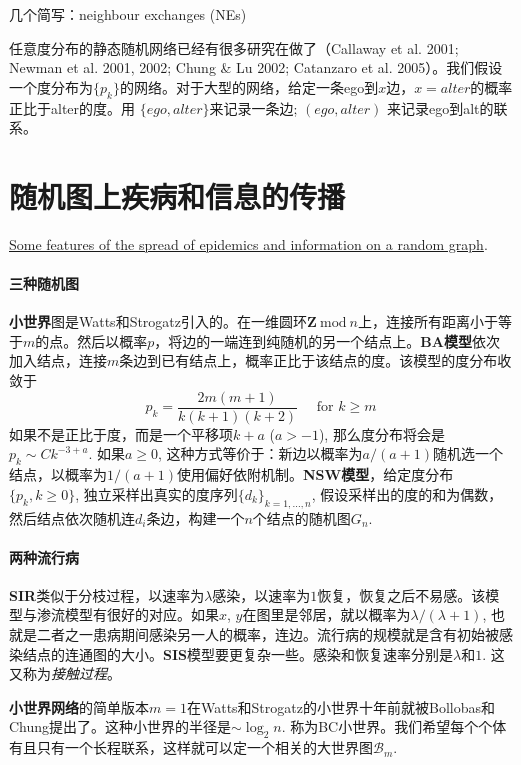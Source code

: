 几个简写：neighbour exchanges (NEs)

任意度分布的静态随机网络已经有很多研究在做了（Callaway et al. 2001; Newman et al. 2001, 2002; Chung \& Lu 2002; Catanzaro et al. 2005）。我们假设一个度分布为$\{p_k\}$的网络。对于大型的网络，给定一条ego到$x$边，$x=alter$的概率正比于alter的度。用 $\{ego, alter\}$来记录一条边; $(ego, alter)$ 来记录ego到alt的联系。

\section{随机图上疾病和信息的传播}

\href{https://www.pnas.org/content/pnas/107/10/4491.full.pdf}{Some features of the spread of epidemics and information on a random graph}. 

\paragraph{三种随机图}\textbf{小世界}图是Watts和Strogatz引入的。在一维圆环$\mathbf{Z} ~\text{mod}~n$上，连接所有距离小于等于$m$的点。然后以概率$p$，将边的一端连到纯随机的另一个结点上。\textbf{BA模型}依次加入结点，连接$m$条边到已有结点上，概率正比于该结点的度。该模型的度分布收敛于\begin{equation} p_{k}=\frac{2 m(m+1)}{k(k+1)(k+2)} \quad \text { for } k \geq m \end{equation}如果不是正比于度，而是一个平移项$k+a$ ($a>-1$), 那么度分布将会是$p_k\sim C k^{-3+a}$. 如果$a\geq 0$, 这种方式等价于：新边以概率为$a/(a+1)$随机选一个结点，以概率为$1/(a+1)$使用偏好依附机制。\textbf{NSW模型}，给定度分布$\{p_k,k\geq 0\}$, 独立采样出真实的度序列$\{d_k\}_{k=1,\dots, n}$, 假设采样出的度的和为偶数，然后结点依次随机连$d_i$条边，构建一个$n$个结点的随机图$G_{n}$. 

\paragraph{两种流行病}\textbf{SIR}类似于分枝过程，以速率为$\lambda$感染，以速率为$1$恢复，恢复之后不易感。该模型与渗流模型有很好的对应。如果$x$, $y$在图里是邻居，就以概率为$\lambda/(\lambda+1)$, 也就是二者之一患病期间感染另一人的概率，连边。流行病的规模就是含有初始被感染结点的连通图的大小。\textbf{SIS}模型要更复杂一些。感染和恢复速率分别是$\lambda$和$1$. 这又称为\textit{接触过程}。

\textbf{小世界网络}的简单版本$m=1$在Watts和Strogatz的小世界十年前就被Bollobas和Chung提出了。这种小世界的半径是$\sim\log_2 n$. 称为BC小世界。我们希望每个个体有且只有一个长程联系，这样就可以定一个相关的大世界图$\mathscr{B}_m$. 

